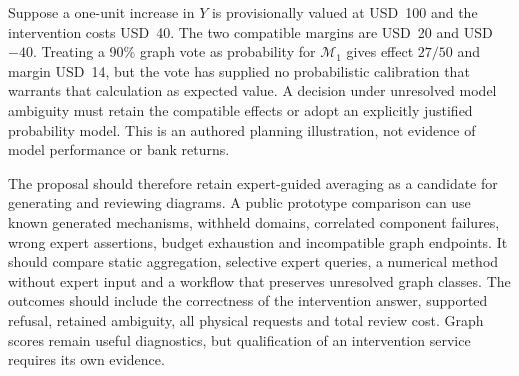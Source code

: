 Suppose a one-unit increase in $Y$ is provisionally valued at USD~100 and the
intervention costs USD~40. The two compatible margins are USD~20 and USD~$-40$.
Treating a 90\% graph vote as probability for $\mathcal M_1$ gives effect
$27/50$ and margin USD~14, but the vote has supplied no probabilistic calibration
that warrants that calculation as expected value. A decision under unresolved
model ambiguity must retain the compatible effects or adopt an explicitly
justified probability model. This is an authored planning illustration, not
evidence of model performance or bank returns. \citep{exec20_expert_averaging_reference}

The proposal should therefore retain expert-guided averaging as a candidate
for generating and reviewing diagrams. A public prototype comparison can use
known generated mechanisms, withheld domains, correlated component failures,
wrong expert assertions, budget exhaustion and incompatible graph endpoints.
It should compare static aggregation, selective expert queries, a numerical
method without expert input and a workflow that preserves unresolved graph
classes. The outcomes should include the correctness of the intervention
answer, supported refusal, retained ambiguity, all physical requests and total
review cost. Graph scores remain useful diagnostics, but qualification of an
intervention service requires its own evidence.

